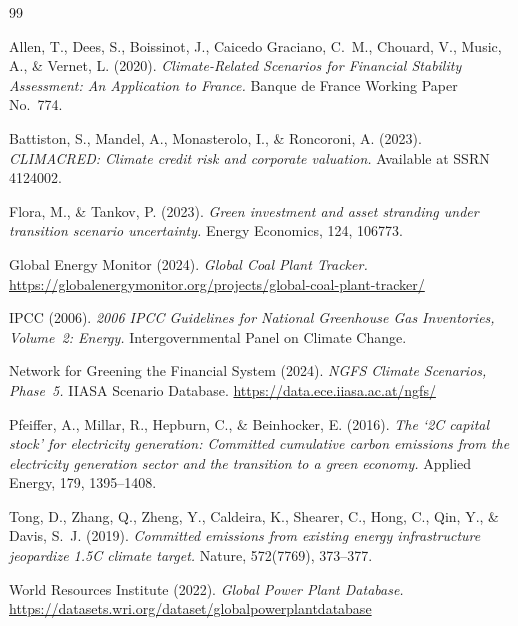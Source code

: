 \documentclass[a4paper, 12pt]{report}
\numberwithin{equation}{chapter}
\numberwithin{figure}{chapter}
\numberwithin{table}{chapter}
\begin{document}
\newpage
\begin{thebibliography}{99}

Allen, T., Dees, S., Boissinot, J., Caicedo Graciano, C.~M., Chouard, V., Music, A., \& Vernet, L. (2020).
\textit{Climate-Related Scenarios for Financial Stability Assessment: An Application to France.}
Banque de France Working Paper No.~774.



Battiston, S., Mandel, A., Monasterolo, I., \& Roncoroni, A. (2023).
\textit{CLIMACRED: Climate credit risk and corporate valuation.}
Available at SSRN 4124002.

Flora, M., \& Tankov, P. (2023).
\textit{Green investment and asset stranding under transition scenario uncertainty.}
Energy Economics, 124, 106773.

Global Energy Monitor (2024).
\textit{Global Coal Plant Tracker.}
\url{https://globalenergymonitor.org/projects/global-coal-plant-tracker/}

IPCC (2006).
\textit{2006 IPCC Guidelines for National Greenhouse Gas Inventories, Volume~2: Energy.}
Intergovernmental Panel on Climate Change.

Network for Greening the Financial System (2024).
\textit{NGFS Climate Scenarios, Phase~5.}
IIASA Scenario Database. \url{https://data.ece.iiasa.ac.at/ngfs/}

Pfeiffer, A., Millar, R., Hepburn, C., \& Beinhocker, E. (2016).
\textit{The `2\textdegree C capital stock' for electricity generation: Committed cumulative carbon emissions from the electricity generation sector and the transition to a green economy.}
Applied Energy, 179, 1395--1408.

Tong, D., Zhang, Q., Zheng, Y., Caldeira, K., Shearer, C., Hong, C., Qin, Y., \& Davis, S.~J. (2019).
\textit{Committed emissions from existing energy infrastructure jeopardize 1.5\textdegree C climate target.}
Nature, 572(7769), 373--377.

World Resources Institute (2022).
\textit{Global Power Plant Database.}
\url{https://datasets.wri.org/dataset/globalpowerplantdatabase}

\end{thebibliography}
\end{document}
